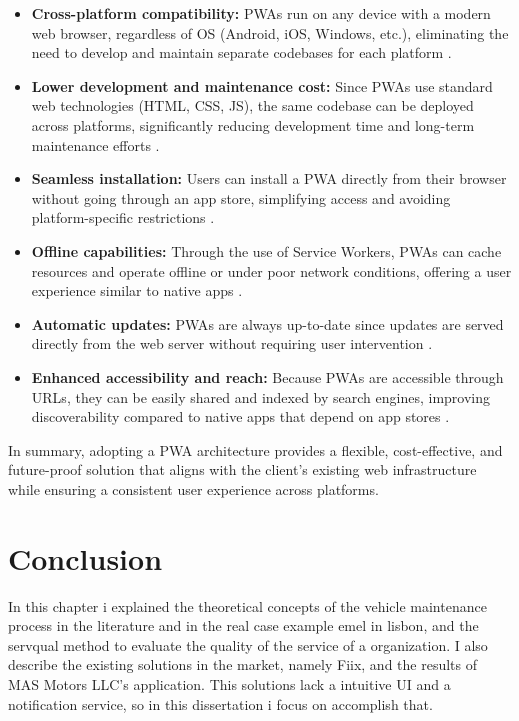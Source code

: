 \begin{itemize}
    \item \textbf{Cross-platform compatibility:} \ac{PWA}s run on any device with a modern web browser, regardless of \ac{OS} (Android, iOS, Windows, etc.), eliminating the need to develop and maintain separate codebases for each platform \cite{Samsyudin}.
    \item \textbf{Lower development and maintenance cost:} Since \ac{PWA}s use standard web technologies (\ac{HTML}, \ac{CSS}, \ac{JS}), the same codebase can be deployed across platforms, significantly reducing development time and long-term maintenance efforts \cite{Naderi2021}.
    \item \textbf{Seamless installation:} Users can install a \ac{PWA} directly from their browser without going through an app store, simplifying access and avoiding platform-specific restrictions \cite{W3C2021}.
    \item \textbf{Offline capabilities:} Through the use of Service Workers, \ac{PWA}s can cache resources and operate offline or under poor network conditions, offering a user experience similar to native apps \cite{Samsyudin} \cite{Lingolu} .
    \item \textbf{Automatic updates:} \ac{PWA}s are always up-to-date since updates are served directly from the web server without requiring user intervention \cite{Alves2020}\cite{Samsyudin}.
    \item \textbf{Enhanced accessibility and reach:} Because \ac{PWA}s are accessible through \ac{URL}s, they can be easily shared and indexed by search engines, improving discoverability compared to native apps that depend on app stores \cite{Raju_Cherukuri_2024}.
\end{itemize}

In summary, adopting a \ac{PWA} architecture provides a flexible, cost-effective, and future-proof solution that aligns with the client's existing web infrastructure while ensuring a consistent user experience across platforms.


\section{Conclusion}

In this chapter i explained the theoretical concepts of the vehicle maintenance process in the literature and in the real case example \ac{emel} in lisbon, and the \ac{servqual} method to evaluate the quality of the service of a organization.
I also describe the existing solutions in the market, namely Fiix, and the results of MAS Motors LLC's application.
This solutions lack a intuitive \ac{UI} and a notification service, so in this dissertation i focus on accomplish that.


